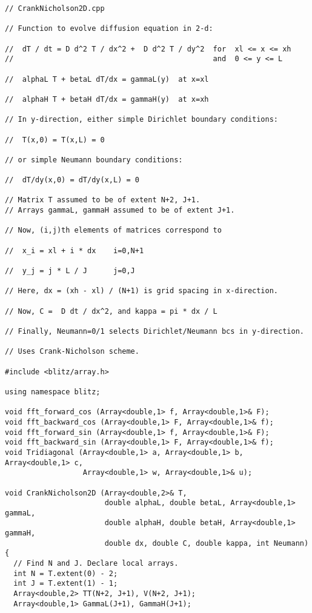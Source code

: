 {\small\begin{verbatim}
// CrankNicholson2D.cpp

// Function to evolve diffusion equation in 2-d:

//  dT / dt = D d^2 T / dx^2 +  D d^2 T / dy^2  for  xl <= x <= xh  
//                                              and  0 <= y <= L

//  alphaL T + betaL dT/dx = gammaL(y)  at x=xl

//  alphaH T + betaH dT/dx = gammaH(y)  at x=xh

// In y-direction, either simple Dirichlet boundary conditions:

//  T(x,0) = T(x,L) = 0

// or simple Neumann boundary conditions:

//  dT/dy(x,0) = dT/dy(x,L) = 0

// Matrix T assumed to be of extent N+2, J+1.
// Arrays gammaL, gammaH assumed to be of extent J+1.

// Now, (i,j)th elements of matrices correspond to

//  x_i = xl + i * dx    i=0,N+1

//  y_j = j * L / J      j=0,J

// Here, dx = (xh - xl) / (N+1) is grid spacing in x-direction.

// Now, C =  D dt / dx^2, and kappa = pi * dx / L

// Finally, Neumann=0/1 selects Dirichlet/Neumann bcs in y-direction.

// Uses Crank-Nicholson scheme.

#include <blitz/array.h>

using namespace blitz;

void fft_forward_cos (Array<double,1> f, Array<double,1>& F);
void fft_backward_cos (Array<double,1> F, Array<double,1>& f);
void fft_forward_sin (Array<double,1> f, Array<double,1>& F);
void fft_backward_sin (Array<double,1> F, Array<double,1>& f);
void Tridiagonal (Array<double,1> a, Array<double,1> b, Array<double,1> c, 
                  Array<double,1> w, Array<double,1>& u);

void CrankNicholson2D (Array<double,2>& T,
                       double alphaL, double betaL, Array<double,1> gammaL, 
                       double alphaH, double betaH, Array<double,1> gammaH,
                       double dx, double C, double kappa, int Neumann)
{
  // Find N and J. Declare local arrays.
  int N = T.extent(0) - 2;
  int J = T.extent(1) - 1;
  Array<double,2> TT(N+2, J+1), V(N+2, J+1);
  Array<double,1> GammaL(J+1), GammaH(J+1);


\end{verbatim}}
